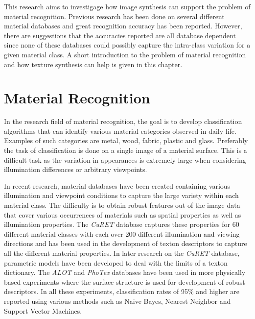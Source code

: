 \hypertarget{MaterialRecognition}{
}

\noindent This research aims to investigage how image synthesis can support the problem of material recognition. Previous research has been done on several different material databases and great recognition accuracy has been reported. However, there are suggestions that the accuracies reported are all database dependent \cite{ExploringFeatures} since none of these databases could possibly capture the intra-class variation for a given material class. A short introduction to the problem of material recognition and how texture synthesis can help is given in this chapter.

\section{Material Recognition}
In the research field of material recognition, the goal is to develop classification algorithms that can identify various material categories observed in daily life. Examples of such categories are metal, wood, fabric, plastic and glass. Preferably the task of classification is done on a single image of a material surface. This is a difficult task as the variation in appearances is extremely large when considering illumination differences or arbitrary viewpoints.

In recent research, material databases have been created containing various illumination and viewpoint conditions to capture the large variety within each  material class. The difficulty is to obtain robust features out of the image data that cover various occurrences of materials such as spatial properties as well as illumination properties. The {\it CuRET} database captures these properties for 60 different material classes with each over 200 different illumination and viewing directions and has been used in the development of texton descriptors to capture all the different material properties. In later research on the {\it CuRET} database, parametric models have been developed to deal with the limits of a texton dictionary. The {\it ALOT} and {\it PhoTex} databases have been used in more physically based experiments where the surface structure is used for development of robust descriptors. In all these experiments, classification rates of 95\% and higher are reported using various methods such as Naive Bayes, Nearest Neighbor and Support Vector Machines. 


